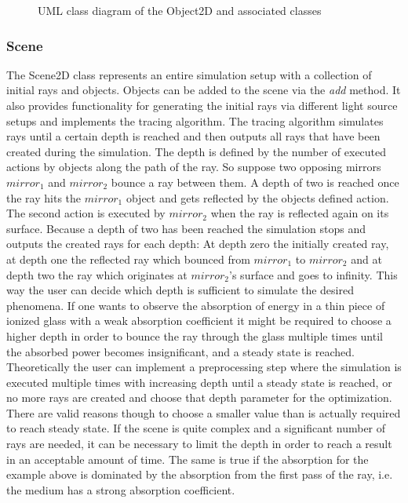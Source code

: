 \documentclass[a4paper,10pt]{article}
\begin{document}
\begin{center}
\begin{figure}
    \caption{UML class diagram of the Object2D and associated classes}
    \label{fig:uml_object2d}
    \end{figure}
    \end{center}

    \subsubsection{Scene}

    The Scene2D class represents an entire simulation setup with
    a collection of initial rays and objects.
    Objects can be added to the scene via the \emph{add} method.
    It also provides functionality for generating the initial rays
    via different light source setups and implements the tracing algorithm.
    The tracing algorithm simulates rays until a certain depth is reached
    and then outputs all rays that have been created during the simulation.
    The depth is defined by the number of executed actions by objects 
    along the path of the ray.
    So suppose two opposing mirrors $mirror_1$ and $mirror_2$ bounce a
    ray between them.
    A depth of two is reached once the ray hits the $mirror_1$ object
    and gets reflected by the objects defined action.
    The second action is executed by $mirror_2$ when the ray is reflected
    again on its surface.
    Because a depth of two has been reached the simulation stops and
    outputs the created rays for each depth:
    At depth zero the initially created ray, at depth one the reflected
    ray which bounced from $mirror_1$ to $mirror_2$ and at depth two
    the ray which originates at $mirror_2$'s surface and goes to infinity.
    This way the user can decide which depth is sufficient to simulate
    the desired phenomena.
    If one wants to observe the absorption of energy in a thin piece of
    ionized glass with a weak absorption coefficient it might be required
    to choose a higher depth in order to bounce the ray through the 
    glass multiple times until the absorbed power becomes insignificant,
    and a steady state is reached.
    Theoretically the user can implement a preprocessing step where the
    simulation is executed multiple times with increasing depth until
    a steady state is reached, or no more rays are created and choose
    that depth parameter for the optimization.
    There are valid reasons though to choose a smaller value than is
    actually required to reach steady state.
    If the scene is quite complex and a significant number of rays are
    needed, it can be necessary to limit the depth in order to reach
    a result in an acceptable amount of time.
    The same is true if the absorption for the example above is
    dominated by the absorption from the first pass of the ray, 
    i.e. the medium has a strong absorption coefficient.
\end{document}
